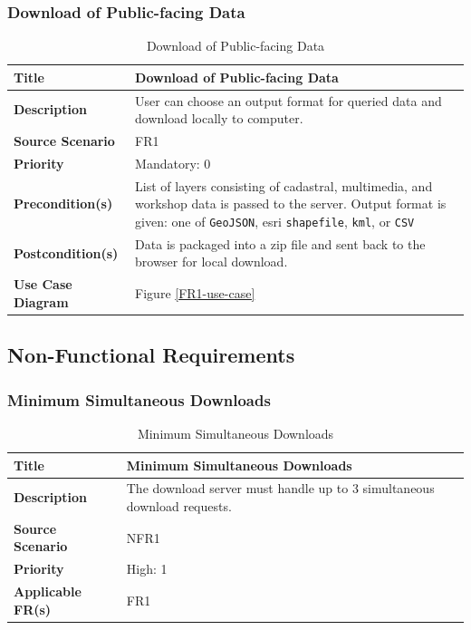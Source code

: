 \documentclass{article}
\begin{document}
\subsubsection{Download of Public-facing Data}

\begin{table}[H]
	\caption{Download of Public-facing Data}
	\begin{tabularx}{\textwidth}{|l|X|}
		\hline
		\textbf{Title}            & Download of Public-facing Data            \\ \hline
		\textbf{Description}      & User can choose an output format for
		queried data and download locally to computer. \\ \hline
		\textbf{Source Scenario}  & FR1                                       \\ \hline
		\textbf{Priority}         & Mandatory: 0                              \\ \hline
		\textbf{Precondition(s)}  & List of layers consisting of cadastral,
		multimedia, and workshop data is passed to the server. Output format
		is given: one of \texttt{GeoJSON}, esri \texttt{shapefile}, \texttt{kml},
		or \texttt{CSV} \\ \hline
		\textbf{Postcondition(s)} & Data is packaged into a zip file and sent
		back to the browser for local download. \\ \hline
		\textbf{Use Case Diagram} & Figure \ref{FR1-use-case}                 \\  \hline
	\end{tabularx}
\end{table}

\subsection{Non-Functional Requirements}

\subsubsection{Minimum Simultaneous Downloads}

\begin{table}[H]
	\caption{Minimum Simultaneous Downloads}
	\begin{tabularx}{\textwidth}{|l|X|}
		\hline
		\textbf{Title}            & Minimum Simultaneous Downloads          \\ \hline
		\textbf{Description}      & The download server must handle up to 3
		simultaneous download requests. \\ \hline
		\textbf{Source Scenario}  & NFR1                                    \\ \hline
		\textbf{Priority}         & High: 1                                 \\ \hline
		\textbf{Applicable FR(s)} & FR1                                     \\ \hline
	\end{tabularx}
\end{table}
\end{document}
